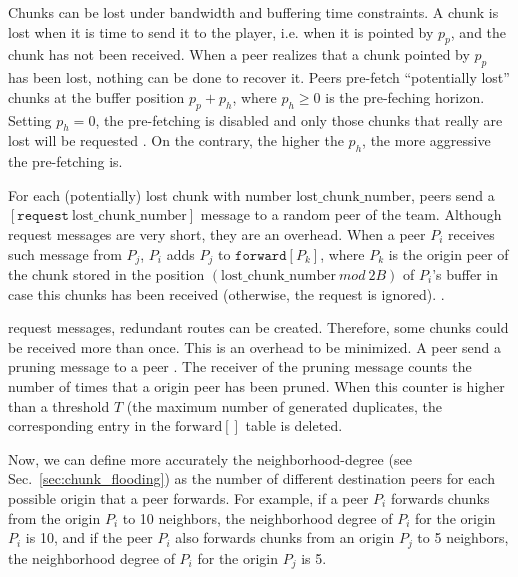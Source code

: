 

\label{sec:routes_discovery}

Chunks can be lost under bandwidth and buffering time constraints. A
chunk is lost when it is time to send it to the player, i.e. when it
is pointed by $p_p$, and the chunk has not been received.  When a peer
realizes that a chunk pointed by $p_p$ has been lost, nothing can be
done to recover it. Peers pre-fetch ``potentially lost'' chunks at the
buffer position $p_p+p_h$, where $p_h\geq 0$ is the pre-feching
horizon. Setting $p_h=0$, the pre-fetching is disabled and only those
chunks that really are lost will be requested .  
  On the contrary, the higher the $p_h$, the more
aggressive the pre-fetching is.

For each (potentially) lost chunk with number
$\text{lost\_chunk\_number}$, peers send a
$[\mathtt{request}~\text{lost\_chunk\_number}]$ message to a random
peer of the team.   Although request messages are very short, they are an overhead.
When a peer $P_i$
receives such message from $P_j$, $P_i$ adds $P_j$ to
$\mathtt{forward}[P_k]$, where $P_k$ is the origin peer of the chunk
stored in the position $(\text{lost\_chunk\_number}~\mathit{mod}~2B)$
of $P_i$'s buffer in case this chunks has been received (otherwise,
the request is ignored). . 

 request messages, redundant routes can be created. Therefore, some chunks could be received more than once. This is an overhead to be minimized. A peer send a pruning message to a peer . The receiver of
the pruning message counts the number of times that a origin peer has
been  pruned. When this counter is higher than a threshold $T$ (the
maximum number of generated duplicates, the corresponding entry in the $\text{forward}[]$ table is deleted.

Now, we can define more accurately the \gls{neighborhood-degree} (see
Sec.~\ref{sec:chunk_flooding}) as the number of different destination
peers for each possible origin that a peer forwards. For example, if a
peer $P_i$ forwards chunks from the origin $P_i$ to 10 neighbors, the
neighborhood degree of $P_i$ for the origin $P_i$ is 10, and if the
peer $P_i$ also forwards chunks from an origin $P_j$ to 5 neighbors,
the neighborhood degree of $P_i$ for the origin $P_j$ is 5.

